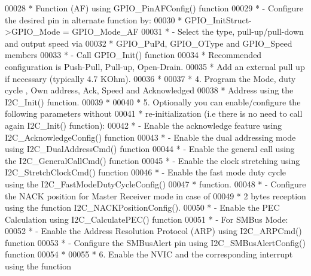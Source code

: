 \begin{DoxyCode}
00028 \textcolor{comment}{  *                   Function (AF) using GPIO\_PinAFConfig() function}
00029 \textcolor{comment}{  *                 - Configure the desired pin in alternate function by:}
00030 \textcolor{comment}{  *                   GPIO\_InitStruct->GPIO\_Mode = GPIO\_Mode\_AF}
00031 \textcolor{comment}{  *                 - Select the type, pull-up/pull-down and output speed via }
00032 \textcolor{comment}{  *                   GPIO\_PuPd, GPIO\_OType and GPIO\_Speed members}
00033 \textcolor{comment}{  *                 - Call GPIO\_Init() function}
00034 \textcolor{comment}{  *                 Recommended configuration is Push-Pull, Pull-up, Open-Drain.}
00035 \textcolor{comment}{  *                 Add an external pull up if necessary (typically 4.7 KOhm).      }
00036 \textcolor{comment}{  *        }
00037 \textcolor{comment}{  *          4. Program the Mode, duty cycle , Own address, Ack, Speed and Acknowledged}
00038 \textcolor{comment}{  *             Address using the I2C\_Init() function.}
00039 \textcolor{comment}{  *}
00040 \textcolor{comment}{  *          5. Optionally you can enable/configure the following parameters without}
00041 \textcolor{comment}{  *             re-initialization (i.e there is no need to call again I2C\_Init() function):}
00042 \textcolor{comment}{  *              - Enable the acknowledge feature using I2C\_AcknowledgeConfig() function}
00043 \textcolor{comment}{  *              - Enable the dual addressing mode using I2C\_DualAddressCmd() function}
00044 \textcolor{comment}{  *              - Enable the general call using the I2C\_GeneralCallCmd() function}
00045 \textcolor{comment}{  *              - Enable the clock stretching using I2C\_StretchClockCmd() function}
00046 \textcolor{comment}{  *              - Enable the fast mode duty cycle using the I2C\_FastModeDutyCycleConfig()}
00047 \textcolor{comment}{  *                function.}
00048 \textcolor{comment}{  *              - Configure the NACK position for Master Receiver mode in case of }
00049 \textcolor{comment}{  *                2 bytes reception using the function I2C\_NACKPositionConfig().  }
00050 \textcolor{comment}{  *              - Enable the PEC Calculation using I2C\_CalculatePEC() function}
00051 \textcolor{comment}{  *              - For SMBus Mode: }
00052 \textcolor{comment}{  *                   - Enable the Address Resolution Protocol (ARP) using I2C\_ARPCmd() function}
00053 \textcolor{comment}{  *                   - Configure the SMBusAlert pin using I2C\_SMBusAlertConfig() function}
00054 \textcolor{comment}{  *}
00055 \textcolor{comment}{  *          6. Enable the NVIC and the corresponding interrupt using the function }

\end{DoxyCode}
